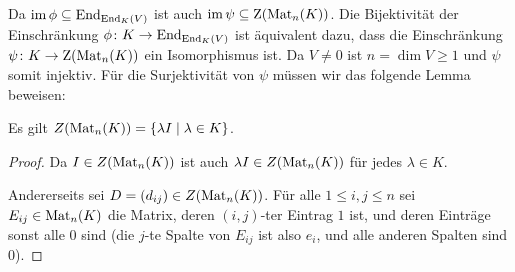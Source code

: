 \documentclass[a4paper, 10pt, numbers=noenddot]{scrartcl}
\begin{document}
Da $\operatorname{im} \phi \subseteq \operatorname{End}_{\operatorname{End}_K(V)}$ ist auch $\operatorname{im} \psi \subseteq \operatorname{Z}(\operatorname{Mat}_n(K))$.
Die Bijektivität der Einschränkung $\phi \colon K \to \operatorname{End}_{\operatorname{End}_K(V)}$ ist äquivalent dazu, dass die Einschränkung $\psi \colon K \to \operatorname{Z}(\operatorname{Mat}_n(K))$ ein Isomorphismus ist.
Da $V \neq 0$ ist $n = \dim V \geq 1$ und $\psi$ somit injektiv.
Für die Surjektivität von $\psi$ müssen wir das folgende Lemma beweisen:

\begin{lemma}
  \label{lem: center of matrix rings}
  Es gilt $Z(\operatorname{Mat}_n(K)) = \{ \lambda I \mid \lambda \in K\}$.
\end{lemma}
\begin{proof}
  Da $I \in Z(\operatorname{Mat}_n(K))$ ist auch $\lambda I \in Z(\operatorname{Mat}_n(K))$ für jedes $\lambda \in K$.
  
  Andererseits sei $D = (d_{ij}) \in Z(\operatorname{Mat}_n(K))$.
  Für alle $1 \leq i,j \leq n$ sei $E_{ij} \in \operatorname{Mat}_n(K)$ die Matrix, deren $(i,j)$-ter Eintrag $1$ ist, und deren Einträge sonst alle $0$ sind (die $j$-te Spalte von $E_{ij}$ ist also $e_i$, und alle anderen Spalten sind $0$).
  

\end{proof}
\end{document}
